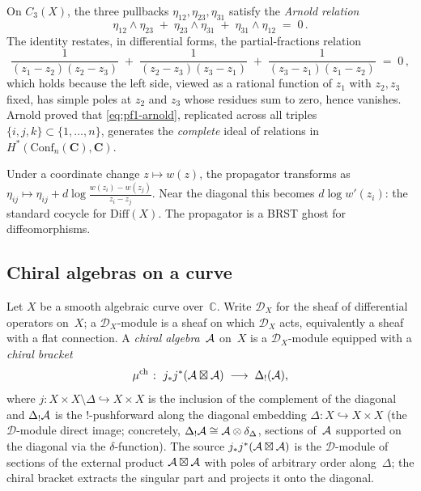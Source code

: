 On $C_3(X)$, the three pullbacks $\eta_{12}, \eta_{23}, \eta_{31}$ satisfy
the \emph{Arnold relation}
\begin{equation}\label{eq:pf1-arnold}
\eta_{12} \wedge \eta_{23} \;+\; \eta_{23} \wedge \eta_{31}
\;+\; \eta_{31} \wedge \eta_{12} \;=\; 0\,.
\end{equation}
The identity restates, in differential forms, the partial-fractions relation
\[
\frac{1}{(z_1 - z_2)(z_2 - z_3)}
\;+\; \frac{1}{(z_2 - z_3)(z_3 - z_1)}
\;+\; \frac{1}{(z_3 - z_1)(z_1 - z_2)}
\;=\; 0\,,
\]
which holds because the left side, viewed as a rational function of $z_1$
with $z_2, z_3$ fixed, has simple poles at $z_2$ and $z_3$ whose residues
sum to zero, hence vanishes. Arnold proved that
\eqref{eq:pf1-arnold}, replicated across all triples
$\{i,j,k\} \subset \{1, \ldots, n\}$, generates the \emph{complete} ideal
of relations in $H^*(\mathrm{Conf}_n(\mathbf{C}), \mathbf{C})$.

Under a coordinate change $z \mapsto w(z)$, the propagator transforms as
$\eta_{ij} \mapsto \eta_{ij} + d\log\frac{w(z_i) - w(z_j)}{z_i - z_j}$.
Near the diagonal this becomes $d\log w'(z_i)$: the standard cocycle for
$\mathrm{Diff}(X)$. The propagator is a BRST ghost for diffeomorphisms.


\subsection*{Chiral algebras on a curve}

Let $X$ be a smooth algebraic curve over~$\mathbb C$. Write
$\mathcal D_X$ for the sheaf of differential operators on~$X$; a
$\mathcal D_X$-module is a sheaf on which $\mathcal D_X$ acts,
equivalently a sheaf with a flat connection.
A \emph{chiral algebra}~$\mathcal{A}$ on~$X$ is a $\mathcal D_X$-module
equipped with a \emph{chiral bracket}
\[
\mu^{\mathrm{ch}}
\;\colon\;
j_*j^*(\mathcal{A}\boxtimes\mathcal{A})
\;\longrightarrow\;
\Delta_!(\mathcal{A}),
\]
where $j\colon X\times X\setminus\Delta
\hookrightarrow X\times X$ is the inclusion of the
complement of the diagonal and
$\Delta_!\mathcal{A}$ is the $!$-pushforward along the diagonal
embedding $\Delta\colon X\hookrightarrow X\times X$
(the $\mathcal{D}$-module direct image; concretely,
$\Delta_!\mathcal{A} \cong \mathcal{A} \otimes \delta_\Delta$, sections
of~$\mathcal{A}$ supported on the diagonal via the
$\delta$-function). The source
$j_*j^*(\mathcal{A}\boxtimes\mathcal{A})$ is the $\mathcal{D}$-module
of sections of the external product
$\mathcal{A} \boxtimes \mathcal{A}$ with poles of arbitrary order
along~$\Delta$; the chiral bracket extracts the
singular part and projects it onto the diagonal.

